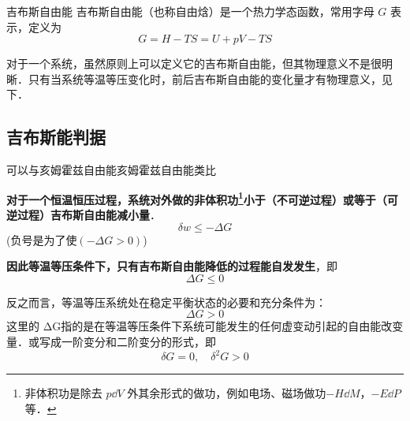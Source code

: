 
\begin{issues}
\end{issues}


\begin{definition}{吉布斯自由能}
吉布斯自由能（也称自由焓）是一个热力学态函数，常用字母 $G$ 表示，定义为
\begin{equation}
G=H-TS=U+pV-TS
\end{equation}
\end{definition}

对于一个系统，虽然原则上可以定义它的吉布斯自由能，但其物理意义不是很明晰．只有当系统等温等压变化时，前后吉布斯自由能的变化量才有物理意义，见下．

\subsection{吉布斯能判据}
可以与亥姆霍兹自由能亥姆霍兹自由能类比

\begin{theorem}{}
\textbf{对于一个恒温恒压过程，系统对外做的非体积功\footnote{非体积功是除去 $p\dd V$ 外其余形式的做功，例如电场、磁场做功$-H\dd M$，$-E\dd P$ 等．}小于（不可逆过程）或等于（可逆过程）吉布斯自由能减小量}．
\begin{equation}
\delta w \le -\Delta G
\end{equation}
(负号是为了使$(- \Delta G > 0)$)
\end{theorem}

\begin{corollary}{}
\textbf{因此等温等压条件下，只有吉布斯自由能降低的过程能自发发生}，即
\begin{equation}
\Delta G \le 0
\end{equation}
\end{corollary}

\begin{corollary}{}
反之而言，等温等压系统处在稳定平衡状态的必要和充分条件为：
\begin{equation}
\Delta G>0
\end{equation}
这里的 ΔG指的是在等温等压条件下系统可能发生的任何虚变动引起的自由能改变量．或写成一阶变分和二阶变分的形式，即
\begin{equation}\label{GibbsG_eq2}
\delta G=0,\quad \delta^2 G>0
\end{equation}
\end{corollary}

